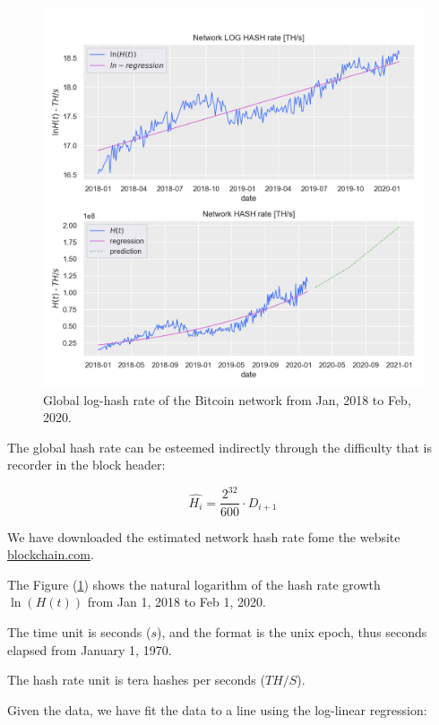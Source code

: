 \documentclass{article}
\begin{document}
\begin{figure}[!htb]
    \centering
    \includegraphics[width=1.0\textwidth]{img/bitcoin-hash-rate.png}
    \caption{Global log-hash rate of the Bitcoin network from Jan, 2018 to Feb, 2020.}
    \label{fig:hash_power}
\end{figure}

The global hash rate can be esteemed indirectly through the difficulty that is recorder in the block header:

\begin{equation}
    \widehat{H_{i}} = \frac{2^{32}}{600} \cdot D_{i+1} \label{H_estimate}
\end{equation}

We have downloaded the estimated network hash rate fome the website \href{https://www.blockchain.com/}{blockchain.com}.

The Figure (\ref{fig:hash_power}) shows the natural logarithm of the hash rate growth $\ln(H(t))$ from Jan 1, 2018 to Feb 1, 2020.

The time unit is seconds ($s$), and the format is the unix epoch, thus seconds elapsed from January 1, 1970.

The hash rate unit is tera hashes per seconds ($TH/S$).

Given the data, we have fit the data to a line using the log-linear regression:
\end{document}
